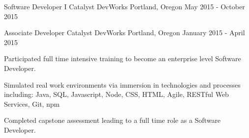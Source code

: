 \begin{cventries}
  \cventry
    {Software Developer I}
    {Catalyst DevWorks}
    {Portland, Oregon}
    {May 2015 - October 2015}
    {}

  \cventry
    {Associate Developer}
    {Catalyst DevWorks}
    {Portland, Oregon}
    {January 2015 - April 2015}
    {
      \begin{cvitems}
        \item {Participated full time intensive training to become an enterprise level Software Developer.}
        \item {Simulated real work environments via immersion in technologies and processes including: Java, SQL, Javascript, Node, CSS, HTML, Agile, RESTful Web Services, Git, npm}
        \item {Completed capstone assessment leading to a full time role as a Software Developer.}
      \end{cvitems}
    }

\end{cventries}
